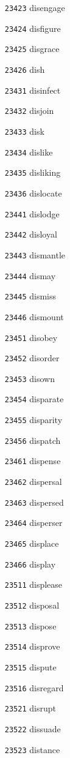 \documentclass[twoside,11pt]{article}
\begin{document}
\begin{multicols}{5}
\begin{enumerate}
\item[\texttt{23423}] disengage
\item[\texttt{23424}] disfigure
\item[\texttt{23425}] disgrace
\item[\texttt{23426}] dish
\item[\texttt{23431}] disinfect
\item[\texttt{23432}] disjoin
\item[\texttt{23433}] disk
\item[\texttt{23434}] dislike
\item[\texttt{23435}] disliking
\item[\texttt{23436}] dislocate
\item[\texttt{23441}] dislodge
\item[\texttt{23442}] disloyal
\item[\texttt{23443}] dismantle
\item[\texttt{23444}] dismay
\item[\texttt{23445}] dismiss
\item[\texttt{23446}] dismount
\item[\texttt{23451}] disobey
\item[\texttt{23452}] disorder
\item[\texttt{23453}] disown
\item[\texttt{23454}] disparate
\item[\texttt{23455}] disparity
\item[\texttt{23456}] dispatch
\item[\texttt{23461}] dispense
\item[\texttt{23462}] dispersal
\item[\texttt{23463}] dispersed
\item[\texttt{23464}] disperser
\item[\texttt{23465}] displace
\item[\texttt{23466}] display
\item[\texttt{23511}] displease
\item[\texttt{23512}] disposal
\item[\texttt{23513}] dispose
\item[\texttt{23514}] disprove
\item[\texttt{23515}] dispute
\item[\texttt{23516}] disregard
\item[\texttt{23521}] disrupt
\item[\texttt{23522}] dissuade
\item[\texttt{23523}] distance

\end{enumerate}
\end{multicols}
\end{document}
